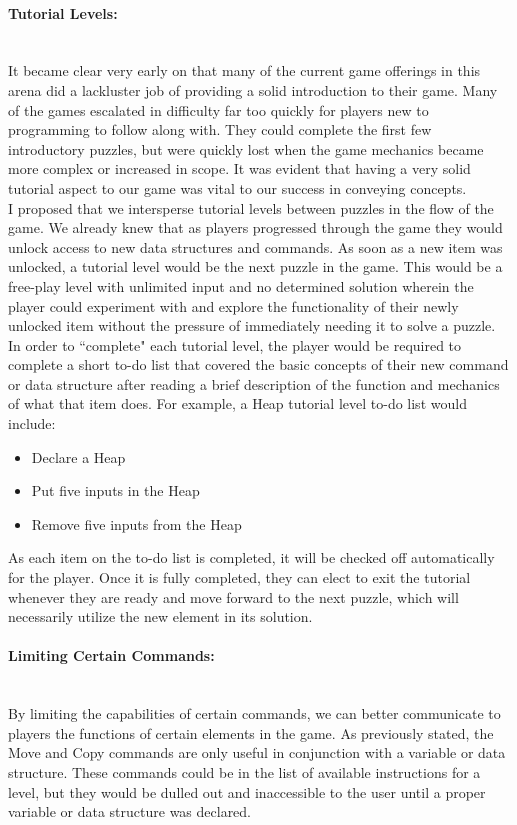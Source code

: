 \paragraph{Tutorial Levels:} ~\\
It became clear very early on that many of the current game offerings in this arena did a lackluster job of providing a solid introduction to their game. Many of the games escalated in difficulty far too quickly for players new to programming to follow along with. They could complete the first few introductory puzzles, but were quickly lost when the game mechanics became more complex or increased in scope. It was evident that having a very solid tutorial aspect to our game was vital to our success in conveying concepts.\\

I proposed that we intersperse tutorial levels between puzzles in the flow of the game. We already knew that as players progressed through the game they would unlock access to new data structures and commands. As soon as a new item was unlocked, a tutorial level would be the next puzzle in the game. This would be a free-play level with unlimited input and no determined solution wherein the player could experiment with and explore the functionality of their newly unlocked item without the pressure of immediately needing it to solve a puzzle.\\

In order to ``complete" each tutorial level, the player would be required to complete a short to-do list that covered the basic concepts of their new command or data structure after reading a brief description of the function and mechanics of what that item does. For example, a Heap tutorial level to-do list would include:
\begin{itemize}
	\item Declare a Heap
	\item Put five inputs in the Heap
	\item Remove five inputs from the Heap
\end{itemize}
As each item on the to-do list is completed, it will be checked off automatically for the player. Once it is fully completed, they can elect to exit the tutorial whenever they are ready and move forward to the next puzzle, which will necessarily utilize the new element in its solution. \\

\paragraph{Limiting Certain Commands:} ~\\
By limiting the capabilities of certain commands, we can better communicate to players the functions of certain elements in the game. As previously stated, the Move and Copy commands are only useful in conjunction with a variable or data structure. These commands could be in the list of available instructions for a level, but they would be dulled out and inaccessible to the user until a proper variable or data structure was declared.\\

